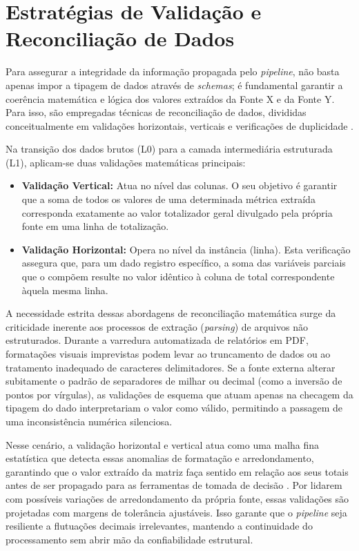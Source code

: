 \section{Estratégias de Validação e Reconciliação de Dados}

Para assegurar a integridade da informação propagada pelo \textit{pipeline}, não basta apenas impor a tipagem de dados através de \textit{schemas}; é fundamental garantir a coerência matemática e lógica dos valores extraídos da Fonte X e da Fonte Y. Para isso, são empregadas técnicas de reconciliação de dados, divididas conceitualmente em validações horizontais, verticais e verificações de duplicidade \cite{polisetty23}.

Na transição dos dados brutos (L0) para a camada intermediária estruturada (L1), aplicam-se duas validações matemáticas principais:
\begin{itemize}
    \item \textbf{Validação Vertical:} Atua no nível das colunas. O seu objetivo é garantir que a soma de todos os valores de uma determinada métrica extraída corresponda exatamente ao valor totalizador geral divulgado pela própria fonte em uma linha de totalização.
    \item \textbf{Validação Horizontal:} Opera no nível da instância (linha). Esta verificação assegura que, para um dado registro específico, a soma das variáveis parciais que o compõem resulte no valor idêntico à coluna de total correspondente àquela mesma linha.
\end{itemize}

A necessidade estrita dessas abordagens de reconciliação matemática surge da criticidade inerente aos processos de extração (\textit{parsing}) de arquivos não estruturados. Durante a varredura automatizada de relatórios em PDF, formatações visuais imprevistas podem levar ao truncamento de dados ou ao tratamento inadequado de caracteres delimitadores. Se a fonte externa alterar subitamente o padrão de separadores de milhar ou decimal (como a inversão de pontos por vírgulas), as validações de esquema que atuam apenas na checagem da tipagem do dado interpretariam o valor como válido, permitindo a passagem de uma inconsistência numérica silenciosa. 

Nesse cenário, a validação horizontal e vertical atua como uma malha fina estatística que detecta essas anomalias de formatação e arredondamento, garantindo que o valor extraído da matriz faça sentido em relação aos seus totais antes de ser propagado para as ferramentas de tomada de decisão \cite{polisetty23}. Por lidarem com possíveis variações de arredondamento da própria fonte, essas validações são projetadas com margens de tolerância ajustáveis. Isso garante que o \textit{pipeline} seja resiliente a flutuações decimais irrelevantes, mantendo a continuidade do processamento sem abrir mão da confiabilidade estrutural.

